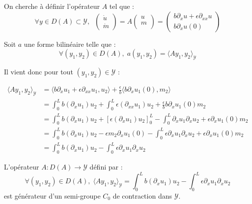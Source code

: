 \documentclass[a4paper]{article}
\newcommand{\dep}{b}
\begin{document}
On cherche à définir l'opérateur $A$ tel que :
\[ \forall y \in D(A) \subset \mathscr{Y}, \; \; 
\left( \begin{array}{c}
\dot{u}\\
\dot{m}
\end{array} \right)
= A \left( \begin{array}{c}
u\\
m\\
\end{array} \right) 
= \left(\begin{array}{c}
\dep \partial_x u + \epsilon \partial_{xx} u\\
\dep \partial_x u(0)
\end{array}\right) \]

Soit $a$ une forme bilinéaire telle que :
\[ \forall (y_1,y_2) \in D(A), \; a(y_1,y_2) = \langle A y_1,y_2\rangle_{\mathscr{Y}} \]

Il vient donc pour tout $(y_1,y_2) \in \mathscr{Y}$ :

\[
\begin{split}
	\langle A y_1,y_2\rangle_{\mathscr{Y}} & = 
	                  \langle \dep \partial_x u_1 + \epsilon \partial_{xx}u_1 ,u_2\rangle
					  + \displaystyle \frac{\epsilon}{\dep} \langle \dep \partial_x u_1(0),m_2\rangle \\	
                        &= \int_0^L b (\partial_xu_1)u_2
                           + \int_0^L \epsilon (\partial_{xx} u_1)u_2
                           + \displaystyle \frac{\epsilon}{\dep} \dep \partial_xu_1(0)m_2\\
						& =   \int_0^L b (\partial_xu_1)u_2
						   + [\epsilon (\partial_x u_1)u_2]_0^L 
						  - \int_0^L \partial_xu_1 \partial_xu_2
						   + \epsilon \partial_xu_1(0)m_2\\
						& = \int_0^L b (\partial_xu_1)u_2
						  -\epsilon m_2 \partial_x u_1(0) 
						 - \int_0^L \epsilon \partial_xu_1 \partial_xu_2
						   + \epsilon \partial_xu_1(0)m_2\\
   						& = \int_0^L b (\partial_xu_1)u_2 
   						 - \int_0^L \epsilon \partial_xu_1 \partial_xu_2
\end{split}
\]

 
\begin{proposition}
	\label{prop:cas2}
	L'opérateur $A: D(A) \to \mathscr{Y}$ défini par :
	\begin{equation} 
		\label{def:A2}
	\forall (y_1,y_2) \in D(A), \; 
	\langle A y_1,y_2\rangle_{\mathscr{Y}} =\int_0^L b (\partial_xu_1)u_2
                           -  \int_0^L \epsilon \partial_xu_1 \partial_xu_2
	\end{equation}
	est générateur d'un semi-groupe $C_0$ de contraction dans $\mathscr{Y}$.
\end{proposition}						
\end{document}
